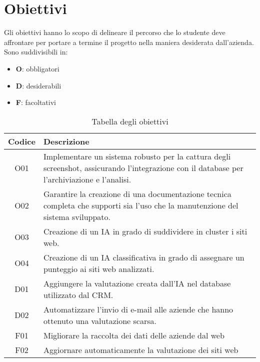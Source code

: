 \section{Obiettivi}
Gli obiettivi hanno lo scopo di delineare il percorso che lo studente deve affrontare per portare a termine il progetto nella maniera desiderata dall'azienda.
Sono suddivisibili in:
\begin{itemize}
    \item \textbf{O}: obbligatori
    \item \textbf{D}: desiderabili
    \item \textbf{F}: facoltativi
\end{itemize}

\begin{table}[h!]
    \centering
    \begin{tabularx}{0.8\textwidth}{|c|X|}
    \hline
    \textbf{Codice} & \textbf{Descrizione}\\
    \hline
    O01 & Implementare un sistema robusto per la cattura degli screenshot, assicurando l’integrazione con il database per l’archiviazione e l’analisi. \\
    \hline
    O02 & Garantire la creazione di una documentazione tecnica completa che supporti sia l’uso che la manutenzione  del sistema sviluppato. \\
    \hline
    O03 & Creazione di un IA in grado di suddividere in cluster i siti web. \\
    \hline
    O04 & Creazione di un IA classificativa in grado di assegnare un punteggio ai siti web analizzati.\\
    \hline
    D01 & Aggiungere la valutazione creata dall'IA nel database utilizzato dal CRM.\\
    \hline
    D02 & Automatizzare l'invio di e-mail alle aziende che hanno ottenuto una valutazione scarsa.\\
    \hline
    F01 & Migliorare la raccolta dei dati delle aziende dal web\\
    \hline
    F02 & Aggiornare automaticamente la valutazione dei siti web\\
    \hline
    \end{tabularx}
    \caption{Tabella degli obiettivi}
    \end{table}


